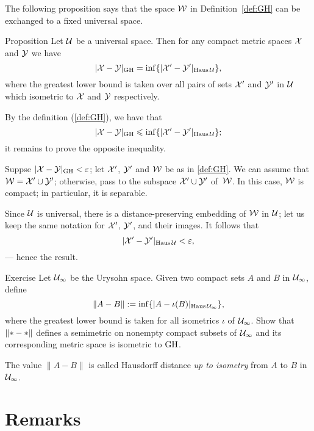 The following proposition says that the space $\mathcal{W}$ in Definition~\ref{def:GH} can be exchanged to a fixed universal space.

\begin{thm}{Proposition}\label{prop:GH-with-fixed-Z}
Let $\mathcal{U}$ be a universal space.
Then for any compact metric spaces $\mathcal{X}$ and $\mathcal{Y}$ we have
$$|\mathcal{X}-\mathcal{Y}|_{\operatorname{\rm GH}\nolimits} = \inf \{|\mathcal{X}'-\mathcal{Y}'|_{\operatorname{\rm Haus}\nolimits\mathcal{U}}\},$$ 
where the greatest lower bound is taken over all pairs of sets $\mathcal{X}'$ and $\mathcal{Y}'$ in $\mathcal{U}$
which isometric to  $\mathcal{X}$ and $\mathcal{Y}$ respectively.  
\end{thm}




By the definition (\ref{def:GH}), we have that 
\[|\mathcal{X}-\mathcal{Y}|_{\operatorname{\rm GH}\nolimits} \leqslant \inf \{|\mathcal{X}'-\mathcal{Y}'|_{\operatorname{\rm Haus}\nolimits\mathcal{U}}\};\]
it remains to prove the opposite inequality.

Suppse $|\mathcal{X}-\mathcal{Y}|_{\operatorname{\rm GH}\nolimits}<\varepsilon$;
let $\mathcal{X}'$, $\mathcal{Y}'$ and $\mathcal{W}$ be as in \ref{def:GH}.
We can assume that $\mathcal{W}=\mathcal{X}'\cup\mathcal{Y}'$;
otherwise, pass to the subspace $\mathcal{X}'\cup\mathcal{Y}'$ of~$\mathcal{W}$.
In this case, $\mathcal{W}$ is compact;
in particular, it is separable.

Since $\mathcal{U}$ is universal, there is a distance-preserving embedding of $\mathcal{W}$ in $\mathcal{U}$;
let us keep the same notation for $\mathcal{X}'$, $\mathcal{Y}'$, and their images.
It follows that 
\[|\mathcal{X}'-\mathcal{Y}'|_{\operatorname{\rm Haus}\nolimits\mathcal{U}}<\varepsilon,\]
--- hence the result.
\qeds

\begin{thm}{Exercise}\label{ex:GH-urysohn}
Let $\mathcal{U}_\infty$ be the Urysohn space.
Given two compact sets $A$ and $B$ in $\mathcal{U}_\infty$, define 
\[\|A-B\|\mathrel{:=}\inf\{|A-\iota(B)|_{\operatorname{\rm Haus}\nolimits\mathcal{U}_\infty}\},\]
where the greatest lower bound is taken for all isometrics $\iota$ of $\mathcal{U}_\infty$.
Show that $\|{*}\z-{*}\|$ defines a semimetric 
on nonempty compact subsets of $\mathcal{U}_\infty$ and its corresponding metric space is isometric to $\operatorname{\rm GH}\nolimits$.
\end{thm}

The value $\|A-B\|$ is called Hausdorff distance \emph{up to isometry} from $A$ to $B$ in $\mathcal{U}_\infty$.

\section{Remarks}\label{sec:remarks-GH}


